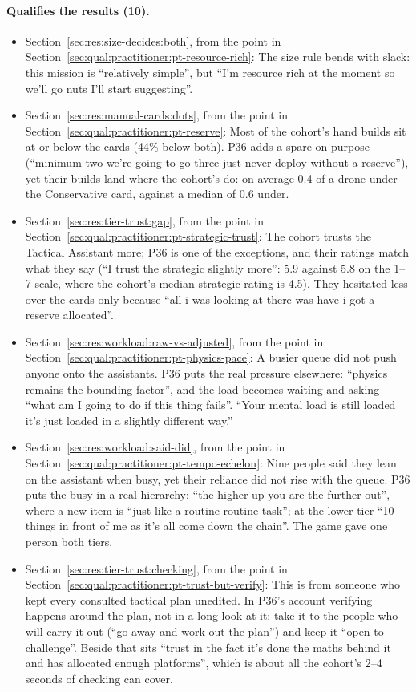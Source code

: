 \paragraph*{Qualifies the results (10).}
\begin{itemize}[leftmargin=1.2em,itemsep=1pt]\small
\item Section~\ref{sec:res:size-decides:both}, from the point in Section~\ref{sec:qual:practitioner:pt-resource-rich}: The size rule bends with slack: this mission is ``relatively simple'', but ``I'm resource rich at the moment so we'll go nuts I'll start suggesting''.
\item Section~\ref{sec:res:manual-cards:dots}, from the point in Section~\ref{sec:qual:practitioner:pt-reserve}: Most of the cohort's hand builds sit at or below the cards (44\% below both). P36 adds a spare on purpose (``minimum two we're going to go three just never deploy without a reserve''), yet their builds land where the cohort's do: on average 0.4 of a drone under the Conservative card, against a median of 0.6 under.
\item Section~\ref{sec:res:tier-trust:gap}, from the point in Section~\ref{sec:qual:practitioner:pt-strategic-trust}: The cohort trusts the Tactical Assistant more; P36 is one of the exceptions, and their ratings match what they say (``I trust the strategic slightly more'': 5.9 against 5.8 on the 1--7 scale, where the cohort's median strategic rating is 4.5). They hesitated less over the cards only because ``all i was looking at there was have i got a reserve allocated''.
\item Section~\ref{sec:res:workload:raw-vs-adjusted}, from the point in Section~\ref{sec:qual:practitioner:pt-physics-pace}: A busier queue did not push anyone onto the assistants. P36 puts the real pressure elsewhere: ``physics remains the bounding factor'', and the load becomes waiting and asking ``what am I going to do if this thing fails''. ``Your mental load is still loaded it's just loaded in a slightly different way.''
\item Section~\ref{sec:res:workload:said-did}, from the point in Section~\ref{sec:qual:practitioner:pt-tempo-echelon}: Nine people said they lean on the assistant when busy, yet their reliance did not rise with the queue. P36 puts the busy in a real hierarchy: ``the higher up you are the further out'', where a new item is ``just like a routine routine task''; at the lower tier ``10 things in front of me as it's all come down the chain''. The game gave one person both tiers.
\item Section~\ref{sec:res:tier-trust:checking}, from the point in Section~\ref{sec:qual:practitioner:pt-trust-but-verify}: This is from someone who kept every consulted tactical plan unedited. In P36's account verifying happens around the plan, not in a long look at it: take it to the people who will carry it out (``go away and work out the plan'') and keep it ``open to challenge''. Beside that sits ``trust in the fact it's done the maths behind it and has allocated enough platforms'', which is about all the cohort's 2--4 seconds of checking can cover.

\end{itemize}
